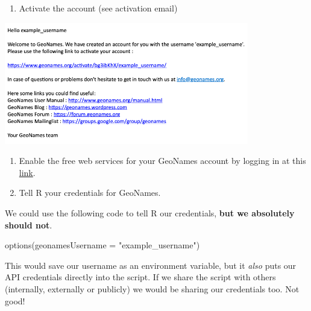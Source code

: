 \documentclass[
  letterpaper,
  DIV=11,
  numbers=noendperiod]{scrreprt}
\newenvironment{Shaded}{\begin{snugshade}}{\end{snugshade}}
\newcommand{\AttributeTok}[1]{\textcolor[rgb]{0.40,0.45,0.13}{#1}}
\newcommand{\FunctionTok}[1]{\textcolor[rgb]{0.28,0.35,0.67}{#1}}
\newcommand{\NormalTok}[1]{\textcolor[rgb]{0.00,0.23,0.31}{#1}}
\newcommand{\StringTok}[1]{\textcolor[rgb]{0.13,0.47,0.30}{#1}}
\providecommand{\tightlist}{%
  \setlength{\itemsep}{0pt}\setlength{\parskip}{0pt}}\usepackage{longtable,booktabs,array}
\begin{document}
\begin{enumerate}
\def\labelenumi{\arabic{enumi}.}
\setcounter{enumi}{2}
\tightlist
\item
  Activate the account (see activation email)
\end{enumerate}

\begin{center}
\includegraphics[width=0.8\textwidth,height=\textheight]{images/203-data-apis/confirmation-email.png}
\end{center}

\begin{enumerate}
\def\labelenumi{\arabic{enumi}.}
\setcounter{enumi}{3}
\item
  Enable the free web services for your GeoNames account by logging in
  at this \href{http://www.geonames.org/enablefreewebservice}{link}.
\item
  Tell R your credentials for GeoNames.
\end{enumerate}

\begin{tcolorbox}[enhanced jigsaw, leftrule=.75mm, bottomtitle=1mm, toprule=.15mm, colbacktitle=quarto-callout-warning-color!10!white, breakable, colback=white, bottomrule=.15mm, opacityback=0, colframe=quarto-callout-warning-color-frame, title=\textcolor{quarto-callout-warning-color}{\faExclamationTriangle}\hspace{0.5em}{Warning}, titlerule=0mm, toptitle=1mm, opacitybacktitle=0.6, arc=.35mm, rightrule=.15mm, coltitle=black, left=2mm]

We could use the following code to tell R our credentials, \textbf{but
we absolutely should not}.

\begin{Shaded}
\begin{Highlighting}[]
\FunctionTok{options}\NormalTok{(}\AttributeTok{geonamesUsername =} \StringTok{"example\_username"}\NormalTok{)}
\end{Highlighting}
\end{Shaded}

This would save our username as an environment variable, but it
\emph{also} puts our API credentials directly into the script. If we
share the script with others (internally, externally or publicly) we
would be sharing our credentials too. Not good!

\end{tcolorbox}
\end{document}

